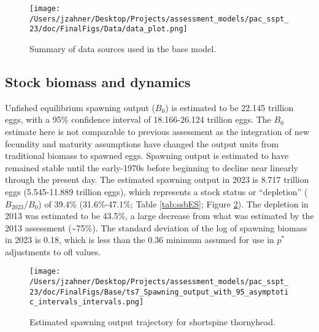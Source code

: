 \documentclass[11pt,
  letterpaper,
]{article}
\begin{document}
\begin{figure}
{\centering
\texttt{[image: /Users/jzahner/Desktop/Projects/assessment\_models/pac\_sspt\_23/doc/FinalFigs/Data/data\_plot.png]}
}
\caption{Summary of data sources used in the base model.\label{fig:assessment_data_timeseriesES}}
\end{figure}

\hypertarget{stock-biomass-and-dynamics}{%
\subsection*{Stock biomass and dynamics}\label{stock-biomass-and-dynamics}}

Unfished equilibrium spawning output (\(B_0\)) is estimated to be 22.145 trillion eggs, with a 95\% confidence interval of 18.166-26.124 trillion eggs. The \(B_0\) estimate here is not comparable to previous assessment as the integration of new fecundity and maturity assumptions have changed the output units from traditional biomass to spawned eggs. Spawning output is estimated to have remained stable until the early-1970s before beginning to decline near linearly through the present day. The estimated spawning output in 2023 is 8.717 trillion eggs (5.545-11.889 trillion eggs), which represents a stock status or ``depletion'' (\(B_{2023}/B_0\)) of 39.4\% (31.6\%-47.1\%; Table \ref{tab:ssbES}; Figure \ref{fig:ssb_trajectoryES}). The depletion in 2013 was estimated to be 43.5\%, a large decrease from what was estimated by the 2013 assessment (\textasciitilde75\%). The standard deviation of the log of spawning biomass in 2023 is 0.18, which is less than the 0.36 minimum assumed for use in \(p^*\) adjustments to \gls{ofl} values.

\begin{figure}
{\centering
\texttt{[image: /Users/jzahner/Desktop/Projects/assessment\_models/pac\_sspt\_23/doc/FinalFigs/Base/ts7\_Spawning\_output\_with\_95\_asymptotic\_intervals\_intervals.png]}
}
\caption{Estimated spawning output trajectory for shortspine thornyhead.\label{fig:ssb_trajectoryES}}
\end{figure}

\begingroup\fontsize{10}{12}\selectfont
\begingroup\fontsize{10}{12}\selectfont
\end{document}
